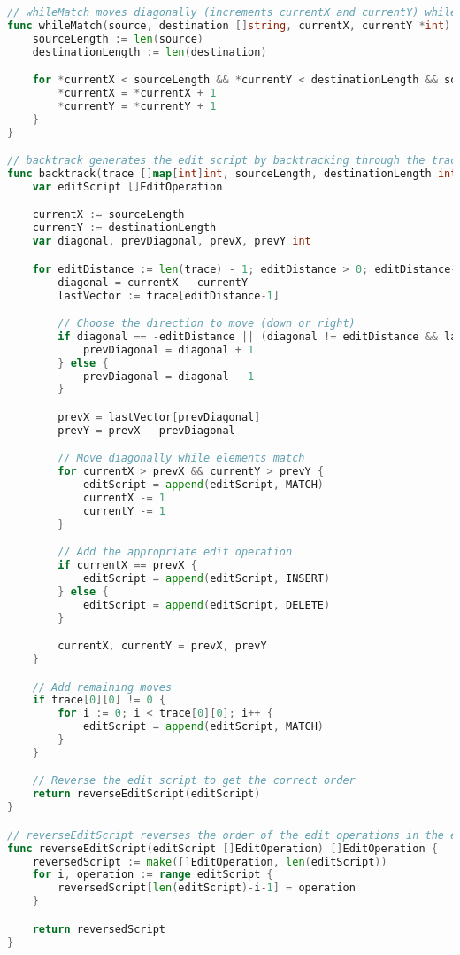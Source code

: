 \begin{lstlisting}[language=go]
// whileMatch moves diagonally (increments currentX and currentY) while elements at the current positions in source and destination match
func whileMatch(source, destination []string, currentX, currentY *int) {
	sourceLength := len(source)
	destinationLength := len(destination)

	for *currentX < sourceLength && *currentY < destinationLength && source[*currentX] == destination[*currentY] {
		*currentX = *currentX + 1
		*currentY = *currentY + 1
	}
}

// backtrack generates the edit script by backtracking through the trace
func backtrack(trace []map[int]int, sourceLength, destinationLength int) []EditOperation {
	var editScript []EditOperation

	currentX := sourceLength
	currentY := destinationLength
	var diagonal, prevDiagonal, prevX, prevY int

	for editDistance := len(trace) - 1; editDistance > 0; editDistance-- {
		diagonal = currentX - currentY
		lastVector := trace[editDistance-1]

		// Choose the direction to move (down or right)
		if diagonal == -editDistance || (diagonal != editDistance && lastVector[diagonal-1] < lastVector[diagonal+1]) {
			prevDiagonal = diagonal + 1
		} else {
			prevDiagonal = diagonal - 1
		}

		prevX = lastVector[prevDiagonal]
		prevY = prevX - prevDiagonal

		// Move diagonally while elements match
		for currentX > prevX && currentY > prevY {
			editScript = append(editScript, MATCH)
			currentX -= 1
			currentY -= 1
		}

		// Add the appropriate edit operation
		if currentX == prevX {
			editScript = append(editScript, INSERT)
		} else {
			editScript = append(editScript, DELETE)
		}

		currentX, currentY = prevX, prevY
	}

	// Add remaining moves
	if trace[0][0] != 0 {
		for i := 0; i < trace[0][0]; i++ {
			editScript = append(editScript, MATCH)
		}
	}

	// Reverse the edit script to get the correct order
	return reverseEditScript(editScript)
}

// reverseEditScript reverses the order of the edit operations in the editScript
func reverseEditScript(editScript []EditOperation) []EditOperation {
	reversedScript := make([]EditOperation, len(editScript))
	for i, operation := range editScript {
		reversedScript[len(editScript)-i-1] = operation
	}

	return reversedScript
}
\end{lstlisting}
\medskip

